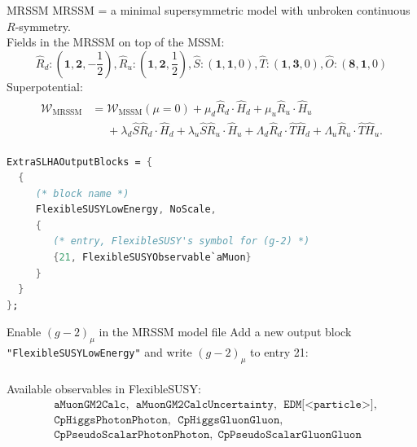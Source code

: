 \documentclass[hyperref={pdfpagelabels=false},ngerman]{beamer}
\begin{document}
\begin{frame}{MRSSM}
  MRSSM = a minimal supersymmetric model with unbroken continuous
  $R$-symmetry.
  \\[1em]
  Fields in the MRSSM on top of the MSSM:
\begin{equation*}
 \hat{R}_d:\textstyle (\mathbf{1} ,\mathbf{2},-\frac{1}{2}) ,
 \hat{R}_u:\textstyle (\mathbf{1} ,\mathbf{2}, \frac{1}{2}) ,
 \hat{S}:\textstyle (\mathbf{1} ,\mathbf{1}, 0) ,
 \hat{T}:\textstyle (\mathbf{1} ,\mathbf{3}, 0) ,
 \hat{O}:\textstyle (\mathbf{8} ,\mathbf{1}, 0)
\end{equation*}
%
Superpotential:
%
\begin{align*}
  \begin{split}
    \mathcal{W}_{\text{MRSSM}} &= \mathcal{W}_{\text{MSSM}}(\mu = 0)
    + \mu_d \hat{R}_d \cdot \hat{H}_d + \mu_u \hat{R}_u\cdot\hat{H}_u \\
    &\phantom{={}}+ \lambda_d \hat{S} \hat{R}_d \cdot \hat{H}_d +
    \lambda_u \hat{S} \hat{R}_u\cdot\hat{H}_u +\Lambda_d
    \hat{R}_d\cdot \hat{T} \hat{H}_d +\Lambda_u \hat{R}_u\cdot\hat{T}
    \hat{H}_u .
  \end{split}
\end{align*}
\end{frame}

\begin{lrbox}{\listbox}\begin{lstlisting}[language=Mathematica]
ExtraSLHAOutputBlocks = {
  {
     (* block name *)
     FlexibleSUSYLowEnergy, NoScale,
     {
        (* entry, FlexibleSUSY's symbol for (g-2) *)
        {21, FlexibleSUSYObservable`aMuon}
     }
  }
};
\end{lstlisting}\end{lrbox} %

\begin{frame}{Enable $(g-2)_\mu$ in the MRSSM model file}
  Add a new output block \texttt{"FlexibleSUSYLowEnergy"} and write
  $(g-2)_\mu$ to entry 21:
  \\[2em]
  \usebox{\listbox}
  \\[1em]
  Available observables in FlexibleSUSY:
  \begin{align*}
    &\texttt{aMuonGM2Calc},\ \ \texttt{aMuonGM2CalcUncertainty},\ \ \texttt{EDM[<particle>]},\\
    &\texttt{CpHiggsPhotonPhoton},\ \ \texttt{CpHiggsGluonGluon},\\
    &\texttt{CpPseudoScalarPhotonPhoton},\ \ \texttt{CpPseudoScalarGluonGluon}
  \end{align*}
\end{frame}
\end{document}

